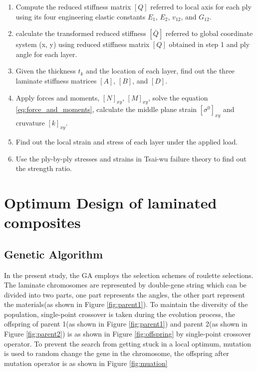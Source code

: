 \documentclass[smallextended]{svjour3}       %
\begin{document}
\begin{enumerate}
	\item Compute the reduced stiffness matrix $[Q]$ referred to local axis for each ply using its
		four engineering elastic constants $E_1$, $E_2$, $v_{12}$, and $G_{12}$.
	\item calculate the transformed reduced stiffness $[\bar{Q}]$ referred to global coordinate
		system (x, y) using reduced stiffness matrix $[Q]$ obtained in step 1 and ply angle for each layer.
	\item Given the thickness $t_k$ and the location of each layer, find out the three laminate
		stiffness matrices $[A]$, $[B]$, and $[D]$.
	\item Apply forces and moments, $[N]_{xy}$, $[M]_{xy}$, solve the equation
		\ref{eq:force_and_moments}, calculate the middle plane strain $[\sigma^0]_{xy}$ and
		cruvature $[k]_{xy}$.
	\item Find out the local strain and stress of each layer under the applied load.
	\item Use the ply-by-ply stresses and strains in Tsai-wu failure theory to find out the strength
		ratio.
\end{enumerate}

\section {Optimum Design of laminated composites}
\subsection{Genetic Algorithm}
In the present study, the GA employs the selection schemes of roulette
selections. The laminate chromosomes are represented by double-gene string
which can be divided into two parts, one part represents the angles, the other
part represent the materials(as shown in Figure \ref{fig:parent1}). To maintain
the diversity of the population, single-point crossover is taken during the
evolution process, the offspring of parent 1(as shown in Figure
\ref{fig:parent1}) and parent 2(as shown in Figure \ref{fig:parent2}) is as
shown in Figure \ref{fig:offspring} by single-point crossover operator. To prevent the
search from getting stuck in a local optimum, mutation is used to random change
the gene in the chromosome, the offspring after mutation operator is as shown
in Figure \ref{fig:muation} 
\end{document}
